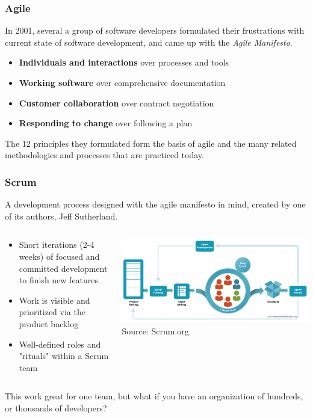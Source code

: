 \begin{frame}
\frametitle{Agile}
In 2001, several a group of software developers formulated their frustrations
with current state of software development, and came up with the
\emph{Agile Manifesto}\footnotemark[1].
\vspace{0.25cm}
\begin{itemize}
    \item \textbf{Individuals and interactions} over processes and tools
    \item \textbf{Working software} over comprehensive documentation
    \item \textbf{Customer collaboration} over contract negotiation
    \item \textbf{Responding to change} over following a plan
\end{itemize}
\vspace{0.25cm}
The 12 principles they formulated form the basis of agile and the many related
methodologies and processes that are practiced today.
\end{frame}

\begin{frame}
\frametitle{Scrum}
A development process designed with the agile manifesto in mind, created by 
one of its authors, Jeff Sutherland.
\begin{columns}[]
    \begin{column}{0.5\textwidth}
        \begin{itemize}
            \item Short iterations (2-4 weeks) of focused and committed
                development to finish new features
            \item Work is visible and prioritized via the product backlog
            \item Well-defined roles and "rituals" within a Scrum team
        \end{itemize}
    \end{column}
    \begin{column}{0.5\textwidth}
        \centering
        \includegraphics[width=\textwidth]{images/scrum.png}\\
        \footnotesize Source: Scrum.org\footnotemark[1]
    \end{column}
\end{columns}
\begin{block}{}
This work great for one team, but what if you have an organization of hundreds,
or thousands of developers?
\end{block}
\end{frame}

